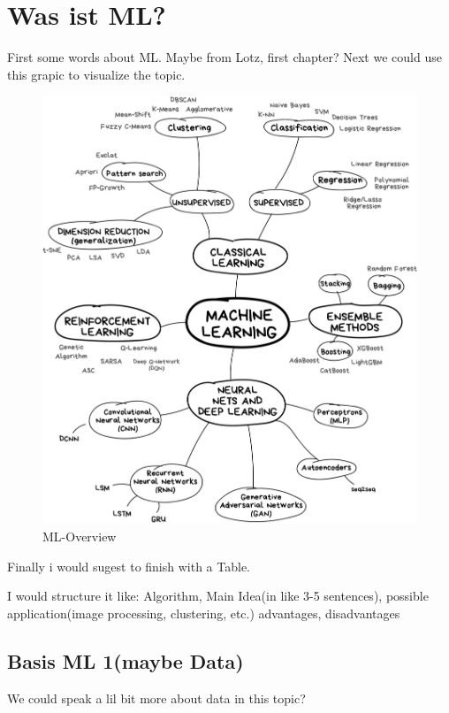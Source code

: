 \documentclass[a4paper,titlepage]{article}
\numberwithin{equation}{section} %
\begin{document}
\section{Was ist ML?}
First some words about ML. Maybe from Lotz, first chapter?
Next we could use this grapic to visualize the topic.
\begin{figure}[hbtp]
	\centering
	\includegraphics[width=1\textwidth]{ML}
	\caption{ML-Overview}
	\label{fig:Datensatz - unbearbeitet}
\end{figure}

Finally i would sugest to finish with a Table.

I would structure it like:
Algorithm, Main Idea(in like 3-5 sentences), possible application(image processing, clustering, etc.) advantages, disadvantages


\subsection{Basis ML 1(maybe Data)}
We could speak a lil bit more about data in this topic?
\end{document}
